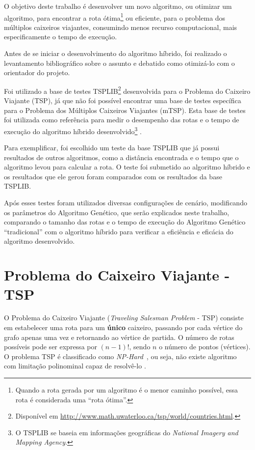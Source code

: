 \documentclass[12pt,openright,a4paper,oneside]{tcc}
\begin{document}
		O objetivo deste trabalho é desenvolver um novo algoritmo, ou otimizar um algoritmo, para encontrar a rota ótima\footnote{Quando a rota gerada por um algoritmo é o menor caminho possível, essa rota é considerada uma ``rota ótima''.} ou eficiente, para o problema dos múltiplos caixeiros viajantes, consumindo menos recurso computacional, mais especificamente o tempo de execução. 

		Antes de se iniciar o desenvolvimento do algoritmo híbrido, foi realizado o levantamento bibliográfico sobre o assunto e debatido como otimizá-lo com o orientador do projeto.

		Foi utilizado a base de testes TSPLIB\footnote{Disponível em \url{http://www.math.uwaterloo.ca/tsp/world/countries.html}.} desenvolvida para o Problema do Caixeiro Viajante (TSP), já que não foi possível encontrar uma base de testes específica para o Problema dos Múltiplos Caixeiros Viajantes (mTSP). Esta base de testes foi utilizada como referência para medir o desempenho das rotas e o tempo de execução do algoritmo híbrido desenvolvido\footnote{O TSPLIB se baseia em informações geográficas do \textit{National Imagery and Mapping Agency}.} \cite{tsplib}.

		Para exemplificar, foi escolhido um teste da base TSPLIB que já possui resultados de outros algoritmos, como a distância encontrada e o tempo que o algoritmo levou para calcular a rota. O teste foi submetido ao algoritmo híbrido e os resultados que ele gerou foram comparados com os resultados da base TSPLIB.

		Após esses testes foram utilizados diversas configurações de cenário, modificando os parâmetros do Algoritmo Genético, que serão explicados neste trabalho, comparando o tamanho das rotas e o tempo de execução do Algoritmo Genético ``tradicional'' com o algoritmo híbrido para verificar a eficiência e eficácia do algoritmo desenvolvido. 

	
	\chapter{Problema do Caixeiro Viajante - TSP}
		O Problema do Caixeiro Viajante (\textit{Traveling Salesman Problem} - TSP) consiste em estabelecer uma rota para um \textbf{único} caixeiro, passando por cada vértice do grafo apenas uma vez e retornando ao vértice de partida. O número de rotas possíveis pode ser expressa por $(n-1)!$, sendo $n$ o número de pontos (vértices).
		O problema TSP é classificado como \textit{NP-Hard}~\cite{0015-pdf}, ou seja, não existe algoritmo com limitação polinominal capaz de resolvê-lo \cite{0010-pdf}. 
		
\end{document}
